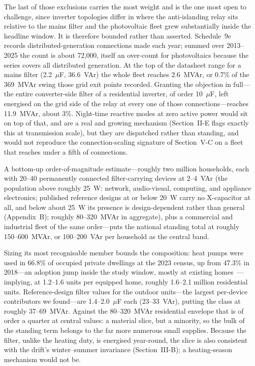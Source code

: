 \documentclass[journal]{IEEEtran}
\begin{document}
The last of those exclusions carries the most weight and is the one most open to
challenge, since inverter topologies differ in where the anti-islanding relay sits
relative to the mains filter and the photovoltaic fleet grew substantially inside
the headline window. It is therefore bounded rather than asserted. Schedule~9e
records distributed-generation connections made each year; summed over 2013--2025
the count is about 72,000, itself an over-count for photovoltaics because the
series covers all distributed generation. At the top of the datasheet range for a
mains filter (2.2~$\mu$F, 36.6~VAr) the whole fleet reaches 2.6~MVAr, or 0.7\% of
the 369~MVAr swing those grid exit points recorded. Granting the objection in
full---the entire converter-side filter of a residential inverter, of order
10~$\mu$F, left energised on the grid side of the relay at every one of those
connections---reaches 11.9~MVAr, about 3\%. Night-time reactive modes at zero
active power would sit on top of that, and are a real and growing mechanism
(Section~II-E flags exactly this at transmission scale), but they are dispatched
rather than standing, and would not reproduce the connection-scaling signature of
Section~V-C on a fleet that reaches under a fifth of connections.

A bottom-up order-of-magnitude estimate---roughly two million households, each with 20--40
permanently connected filter-carrying devices at 2--4~VAr (the population above
roughly 25~W: network, audio-visual, computing, and appliance electronics;
published reference designs at or below 20~W carry no X-capacitor at all, and
below about 25~W its presence is design-dependent rather than general
(Appendix~B); roughly
80--320~MVAr in aggregate), plus a commercial and
industrial fleet of the same order---puts the national standing total at roughly
150--600~MVAr, or 100--200~VAr per household as the central band.

Sizing its most recognisable member bounds the composition: heat pumps were used in 66.8\% of
occupied private dwellings at the 2023 census, up from 47.3\% in 2018---an
adoption jump inside the study window, mostly at existing
homes~\cite{ehinz_heating}---implying, at 1.2--1.6 units per equipped home,
roughly 1.6--2.1 million residential units. Reference-design filter values for
the outdoor units---the largest per-device contributors we found---are
1.4--2.0~$\mu$F each (23--33~VAr), putting the class at roughly 37--69~MVAr.
Against the 80--320~MVAr residential envelope that is of order a quarter at
central values: a material slice, but a minority, so the bulk of the standing
term belongs
to the far more numerous small supplies. Because the filter, unlike the heating
duty, is energised year-round, the slice is also consistent with the drift's
winter--summer invariance (Section~III-B); a heating-season mechanism would not
be.
\end{document}
